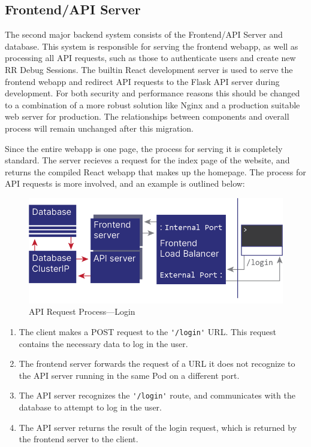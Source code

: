 \documentclass[12pt]{article}
\begin{document}
\subsection{Frontend/API Server}\label{api}

The second major backend system consists of the Frontend/API Server
and database.  This system is responsible for serving the frontend
webapp, as well as processing all API requests, such as those to
authenticate users and create new RR Debug Sessions.  The builtin
React development server is used to serve the frontend webapp and
redirect API requests to the Flask API server during development.  For
both security and performance reasons this should be changed to a
combination of a more robust solution like Nginx \cite{nginx} and a
production suitable web server for production.  The relationships
between components and overall process will remain unchanged after
this migration.
\par

Since the entire webapp is one page, the process for serving it is
completely standard.  The server recieves a request for the index page
of the website, and returns the compiled React webapp that makes up
the homepage.  The process for API requests is more involved, and an
example is outlined below:

\begin{figure}[h!]

  \includegraphics[scale=1]{login_request}
  \centering
  \caption{API Request Process---Login}
  \label{rr:detailed}
\end{figure}

\begin{enumerate}
\item The client makes a POST request to the \lstinline{'/login'} URL.
  This request contains the necessary data to log in the user.
\item The frontend server forwards the request of a URL it does not
  recognize to the API server running in the same Pod on a different
  port.
\item The API server recognizes the \lstinline{'/login'} route, and
  communicates with the database to attempt to log in the user.
\item The API server returns the result of the login request, which is
  returned by the frontend server to the client.
\end{enumerate}
\end{document}
